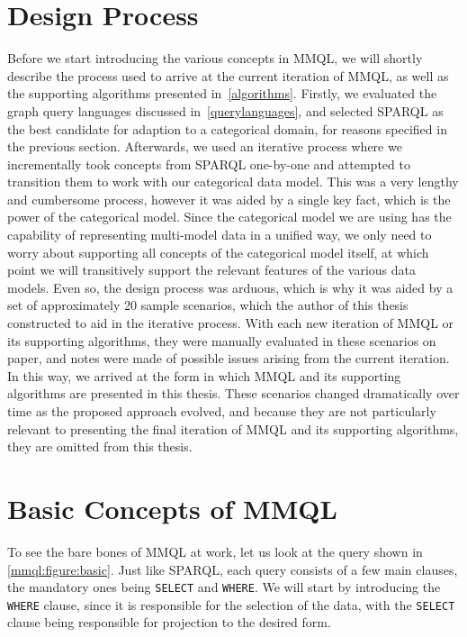 \section{Design Process}

Before we start introducing the various concepts in MMQL, we will shortly describe the process used to arrive at the current iteration of MMQL, as well as the supporting algorithms presented in~\cref{algorithms}.
Firstly, we evaluated the graph query languages discussed in~\cref{querylanguages}, and selected SPARQL as the best candidate for adaption to a categorical domain, for reasons specified in the previous section.
Afterwards, we used an iterative process where we incrementally took concepts from SPARQL one-by-one and attempted to transition them to work with our categorical data model.
This was a very lengthy and cumbersome process, however it was aided by a single key fact, which is the power of the categorical model.
Since the categorical model we are using has the capability of representing multi-model data in a unified way, we only need to worry about supporting all concepts of the categorical model itself, at which point we will transitively support the relevant features of the various data models.
Even so, the design process was arduous, which is why it was aided by a set of approximately 20 sample scenarios, which the author of this thesis constructed to aid in the iterative process.
With each new iteration of MMQL or its supporting algorithms, they were manually evaluated in these scenarios on paper, and notes were made of possible issues arising from the current iteration.
In this way, we arrived at the form in which MMQL and its supporting algorithms are presented in this thesis.
These scenarios changed dramatically over time as the proposed approach evolved, and because they are not particularly relevant to presenting the final iteration of MMQL and its supporting algorithms, they are omitted from this thesis.

\section{Basic Concepts of MMQL}

To see the bare bones of MMQL at work, let us look at the query shown in \cref{mmql:figure:basic}.
Just like SPARQL, each query consists of a few main clauses, the mandatory ones being \texttt{SELECT} and \texttt{WHERE}.
We will start by introducing the \texttt{WHERE} clause, since it is responsible for the selection of the data, with the \texttt{SELECT} clause being responsible for projection to the desired form.

